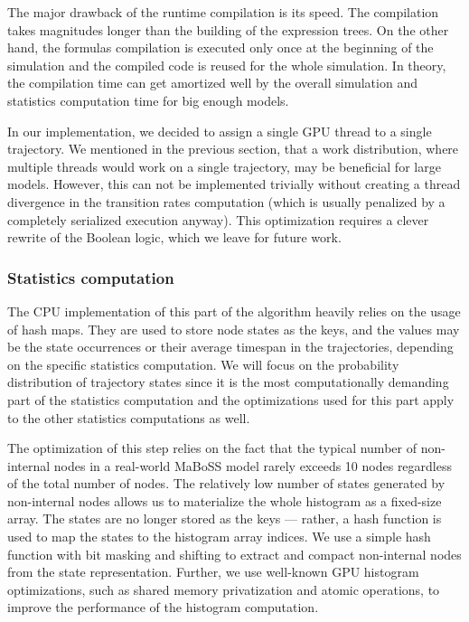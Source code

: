 \documentclass[times, twoside]{zHenriquesLab-StyleBioRxiv}
\begin{document}
The major drawback of the runtime compilation is its speed. The compilation takes magnitudes longer than the building of the expression trees. On the other hand, the formulas compilation is executed only once at the beginning of the simulation and the compiled code is reused for the whole simulation. In theory, the compilation time can get amortized well by the overall simulation and statistics computation time for big enough models.

In our implementation, we decided to assign a single GPU thread to a single trajectory. We mentioned in the previous section, that a work distribution, where multiple threads would work on a single trajectory, may be beneficial for large models. However, this can not be implemented trivially without creating a thread divergence in the transition rates computation (which is usually penalized by a completely serialized execution anyway). This optimization requires a clever rewrite of the Boolean logic, which we leave for future work.

\subsubsection*{Statistics computation}

The CPU implementation of this part of the algorithm heavily relies on the usage of hash maps. They are used to store node states as the keys, and the values may be the state occurrences or their average timespan in the trajectories, depending on the specific statistics computation. We will focus on the probability distribution of trajectory states since it is the most computationally demanding part of the statistics computation and the optimizations used for this part apply to the other statistics computations as well.

The optimization of this step relies on the fact that the typical number of non-internal nodes in a real-world MaBoSS model rarely exceeds 10 nodes regardless of the total number of nodes. The relatively low number of states generated by non-internal nodes allows us to materialize the whole histogram as a fixed-size array. The states are no longer stored as the keys --- rather, a hash function is used to map the states to the histogram array indices. We use a simple hash function with bit masking and shifting to extract and compact non-internal nodes from the state representation. Further, we use well-known GPU histogram optimizations, such as shared memory privatization and atomic operations, to improve the performance of the histogram computation.
\end{document}
